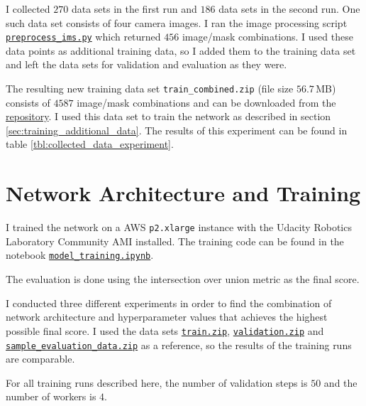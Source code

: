 \documentclass[11pt, onecolumn, oneside, reqno]{article}
\begin{document}
I collected $270$ data sets in the first run and $186$ data sets in the second run. One such data set consists of four camera images. I ran the image processing script \href{https://github.com/S2H-Mobile/RoboND-DeepLearning-Project-Solution/blob/master/code/preprocess_ims.py}{\texttt{preprocess\_ims.py}} which returned $456$ image/mask combinations. I used these data points as additional training data, so I added them to the training data set and left the data sets for validation and evaluation as they were.

The resulting new training data set \texttt{train\_combined.zip} (file size $56.7$\,MB) consists of $4587$ image/mask combinations and can be downloaded from the \href{https://github.com/S2H-Mobile/RoboND-DeepLearning-Project-Solution/tree/master/data}{repository}. I used this data set to train the network as described in section \ref{sec:training_additional_data}. The results of this experiment can be found in table \ref{tbl:collected_data_experiment}.

\section{Network Architecture and Training}
I trained the network on a AWS \texttt{p2.xlarge} instance with the ​Udacity​ ​Robotics​ ​Laboratory​ ​Community​ ​AMI installed. The training code can be found in the notebook \href{https://github.com/S2H-Mobile/RoboND-DeepLearning-Project-Solution/blob/master/code/model_training.ipynb}{\texttt{model\_training.ipynb}}.

The evaluation is done using the intersection over union metric as the final score.

I conducted three different experiments in order to find the combination of network architecture and hyperparameter values that achieves the highest possible final score. I used the data sets \href{https://s3-us-west-1.amazonaws.com/udacity-robotics/Deep+Learning+Data/Lab/train.zip}{\texttt{train.zip}}, \href{https://s3-us-west-1.amazonaws.com/udacity-robotics/Deep+Learning+Data/Lab/validation.zip}{\texttt{validation.zip}} and \href{https://s3-us-west-1.amazonaws.com/udacity-robotics/Deep+Learning+Data/Project/sample_evaluation_data.zip}{\texttt{sample\_evaluation\_data.zip}} as a reference, so the results of the training runs are comparable.

For all training runs described here, the number of validation steps is $50$ and the number of workers is $4$. 
\end{document}

